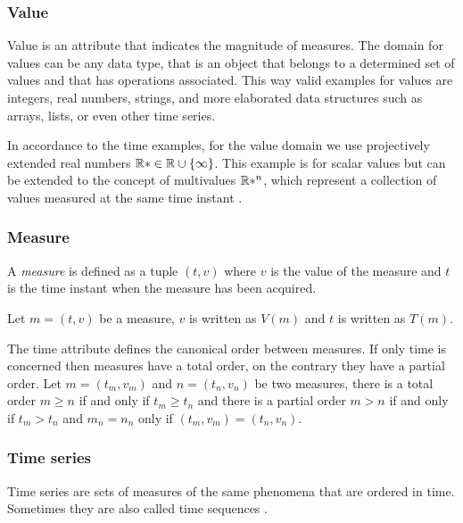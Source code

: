 \subsubsection{Value}

Value is an attribute that indicates the magnitude of measures. The
domain for values can be any data type, that is an object that belongs
to a determined set of values and that has operations associated.
This way valid examples for values are integers, real numbers,
strings, and more elaborated data structures such as arrays, lists, or
even other time series.

In accordance to the time examples, for the value domain we use
projectively extended real numbers $\mathbb{R}* \in \mathbb{R} \cup \{\infty\}$.  This
example is for scalar values but can be extended to the concept of
multivalues $\mathbb{R}*^n$, which represent a collection of values measured
at the same time instant \cite{assfalg08:thesis}.




\subsubsection{Measure}


\begin{definition}
  A \emph{measure} is defined as a tuple $(t,v)$ where $v$ is the
  value of the measure and $t$ is the time instant when the measure
  has been acquired.
\end{definition}

Let $m = (t,v)$ be a measure, $v$ is written as $V(m)$ and $t$ is
written as $T(m)$.

The time attribute defines the canonical order between measures. If
only time is concerned then measures have a total order, on the
contrary they have a partial order. Let $m = (t_m, v_m)$ and $n =
(t_n, v_n)$ be two measures, there is a total order $m\geq n$ if and
only if $t_m\geq t_n$ and there is a partial order $m > n$ if and only
if $t_m > t_n$ and  $m_n = n_n$ only if $(t_m, v_m) = (t_n, v_n)$.






\subsubsection{Time series}

Time series are sets of measures of the same phenomena that are
ordered in time.  Sometimes they are also called time sequences
\cite{last:hetland}.


